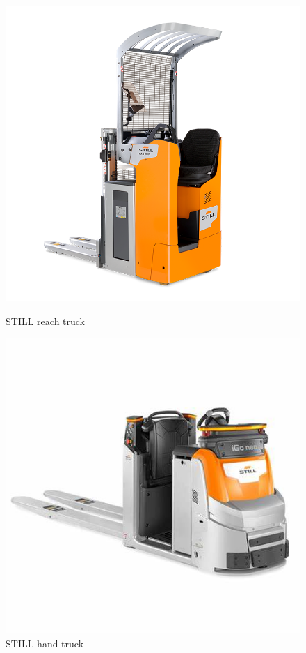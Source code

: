 \begin{figure}[H]
    \centering
    \begin{minipage}{0.45\textwidth}
        \centering
        \includegraphics[width=\linewidth]{images/Chap0/double-.png} %
        \caption{STILL reach truck}
        \label{double-}
    \end{minipage}
    \begin{minipage}{0.45\textwidth}
        \centering
        \includegraphics[width=\linewidth]{images/Chap0/iGoNeo.jpg} %
        \caption{STILL hand truck}
        \label{iGoNeo}
    \end{minipage}
\end{figure}
